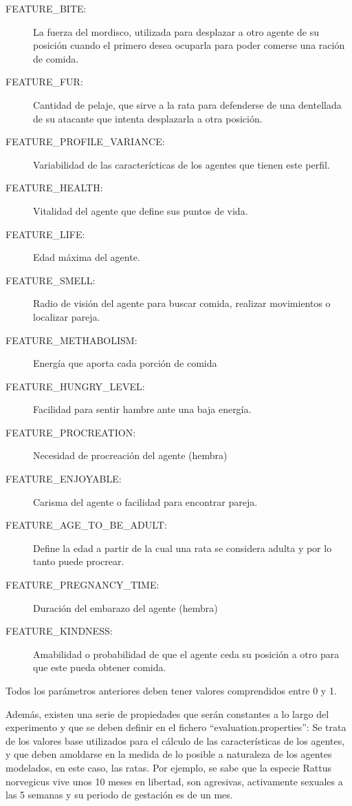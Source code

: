 \begin{description}
\item[FEATURE\_BITE:] La fuerza del mordisco, utilizada para desplazar a otro agente de su posición cuando el primero desea ocuparla para poder comerse una ración de comida.
\item[FEATURE\_FUR:] Cantidad de pelaje, que sirve a la rata para defenderse de una dentellada de su atacante que intenta desplazarla a otra posición.
\item[FEATURE\_PROFILE\_VARIANCE:] Variabilidad de las caracterícticas de los agentes que tienen este perfil.
\item[FEATURE\_HEALTH:] Vitalidad del agente que define sus puntos de vida.
\item[FEATURE\_LIFE:] Edad máxima del agente.
\item[FEATURE\_SMELL:] Radio de visión del agente para buscar comida, realizar movimientos o localizar pareja.
\item[FEATURE\_METHABOLISM:] Energía que aporta cada porción de comida
\item[FEATURE\_HUNGRY\_LEVEL:] Facilidad para sentir hambre ante una baja energía.
\item[FEATURE\_PROCREATION:] Necesidad de procreación del agente (hembra)
\item[FEATURE\_ENJOYABLE:] Carisma del agente o facilidad para encontrar pareja.
\item[FEATURE\_AGE\_TO\_BE\_ADULT:] Define la edad a partir de la cual una rata se considera adulta y por lo tanto puede procrear.
\item[FEATURE\_PREGNANCY\_TIME:] Duración del embarazo del agente (hembra)
\item[FEATURE\_KINDNESS:] Amabilidad o probabilidad de que el agente ceda su posición a otro para que este pueda obtener comida.
\end{description} 

Todos los parámetros anteriores deben tener valores comprendidos entre 0 y 1.

Además, existen una serie de propiedades que  serán constantes a lo largo del
experimento y que se deben definir en el fichero ``evaluation.properties'': Se
trata de los valores base utilizados para el cálculo
de las características de los agentes, y que deben amoldarse en la medida de lo
posible a naturaleza de los agentes modelados, en este caso, las ratas. Por
ejemplo, se sabe que la especie Rattus norvegicus vive unos 10 meses en
libertad, son agresivas, activamente sexuales a las 5 semanas y su periodo de
gestación es de un mes.


